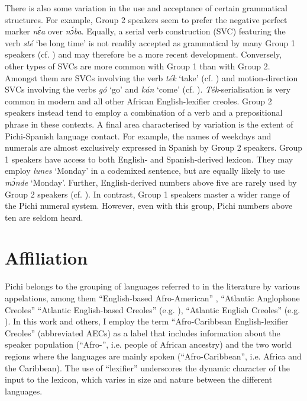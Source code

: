 \bigskip
There is also some variation in the use and acceptance of certain grammatical structures. For example, Group 2 speakers seem to prefer the negative perfect marker \textit{nɛ́a} over \textit{nɔ́ba}. Equally, a serial verb construction (SVC) featuring the verb \textit{sté} ‘be long time’ is not readily accepted as grammatical by many Group 1 speakers (cf. ) and may therefore be a more recent development. Conversely, other types of SVCs are more common with Group 1 than with Group 2. Amongst them are SVCs involving the verb \textit{ték} ‘take’ (cf. ) and motion-direction SVCs involving the verbs \textit{gó} ‘go’ and \textit{kán} ‘come’ (cf. ). \textit{Ték}-serialisation is very common in modern  and all other African English-lexifier creoles. Group 2 speakers instead tend to employ a combination of a verb and a prepositional phrase in these contexts. A final area characterised by variation is the extent of Pichi-Spanish language contact. For example, the names of weekdays and numerals are almost exclusively expressed in Spanish by Group 2 speakers. Group 1 speakers have access to both English- and Spanish-derived lexicon. They may employ \textit{lunes} ‘Monday’ in a codemixed sentence, but are equally likely to use \textit{mɔ́nde} ‘Monday’. Further, English-derived numbers above five are rarely used by Group 2 speakers (cf. ). In contrast, Group 1 speakers master a wider range of the Pichi numeral system. However, even with this group, Pichi numbers above ten are seldom heard.

\section{Affiliation}\label{sec:1.4}

Pichi belongs to the grouping of languages referred to in the literature by various appelations, among them “English-based Afro-American” \citep{Alleyne1980}, “Atlantic Anglophone Creoles” \citep{Hancock1986,Hancock1987} “Atlantic English-based Creoles” (e.g. \citealt{MuyskenSmith1990}), “Atlantic English Creoles” (e.g. \citealt{Baker1999}). In this work and others, I employ the term “Afro-Caribbean English-lexifier Creoles” (abbreviated AECs) \citep{Faraclas2004} as a label that includes information about the speaker population (\mbox{“Afro-”}, i.e. people of African ancestry) and the two world regions where the languages are mainly spoken (“Afro-Caribbean”, i.e. Africa and the Caribbean). The use of “lexifier” underscores the dynamic character of the  input to the lexicon, which varies in size and nature between the different languages. 


